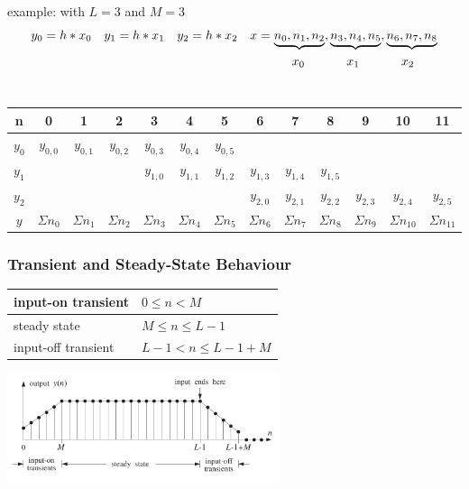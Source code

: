 example: with $L=3$ and $M=3$
\begin{align}
& y_0=h\ast x_0 && y_1=h\ast x_1 && y_2=h\ast x_2 && x={\underbrace{n_0,n_1,n_2},\underbrace{n_3,n_4,n_5},\underbrace{n_6,n_7,n_8}}\notag \\
& && && && \qquad\quad \ x_0 \qquad\quad \ x_1 \qquad\quad \ x_2 \notag
\end{align}\\

\begin{tabular}{c|cccccccccccc}  
	n & 0 & 1 & 2 & 3 & 4 & 5 & 6 & 7 & 8 & 9 & 10 & 11\\
	\hline
	$y_0$ & $y_{0,0}$ & $y_{0,1}$ & $y_{0,2}$ & $y_{0,3}$ & $y_{0,4}$ & $y_{0,5}$ &
	& & & & &\\
	$y_1$ & & & & $y_{1,0}$ & $y_{1,1}$ & $y_{1,2}$ & $y_{1,3}$ & $y_{1,4}$ &
	$y_{1,5}$ & & & \\
	$y_2$ & & & & & & & $y_{2,0}$ & $y_{2,1}$ & $y_{2,2}$ & $y_{2,3}$ & $y_{2,4}$ & $y_{2,5}$
	\\
	\hline
	$y$ & $\Sigma n_{0}$ & $\Sigma n_{1}$&$\Sigma n_{2}$ & $\Sigma n_{3}$&$\Sigma n_{4}$ &$\Sigma n_{5}$ &$\Sigma n_{6}$  &$\Sigma n_{7}$  & $\Sigma n_{8}$ & $\Sigma n_{9}$ & $\Sigma n_{10}$ & $\Sigma n_{11}$
	\\
\end{tabular}


\subsubsection{Transient and Steady-State Behaviour}
\begin{multicols}{2}
	\begin{tabular}{|l|l|}
		\hline
		input-on transient	& $ 0 \leq n < M $
		\\ \hline
		steady state			& $ M \leq n \leq L-1 $
		\\ \hline
		input-off transient		& $ L-1 < n \leq L-1+M $
		\\ \hline
	\end{tabular}

\columnbreak

  \includegraphics[width=8cm]{./picture/transient_steady_state}
\end{multicols}

